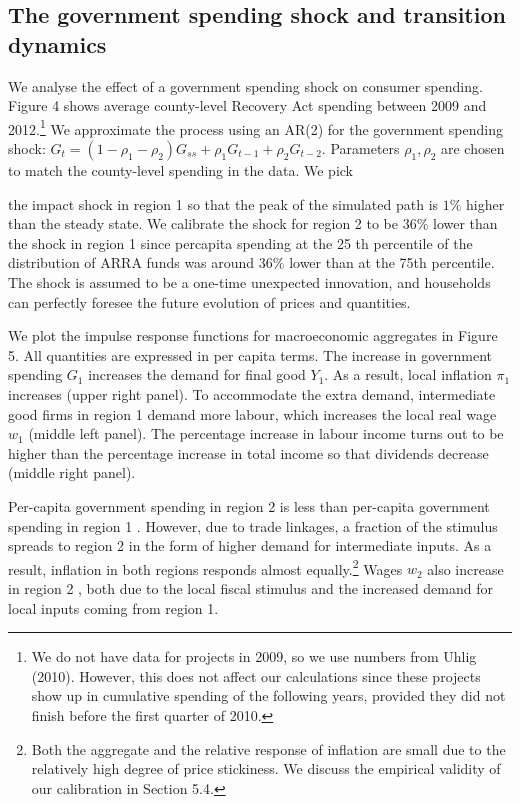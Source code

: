 \documentclass[\latexroot/\projectname]{subfiles}
\begin{document}
\subsection{The government spending shock and transition dynamics}
We analyse the effect of a government spending shock on consumer spending. Figure 4 shows average county-level Recovery Act spending between 2009 and 2012.\footnote{We do not have data for projects in 2009, so we use numbers from Uhlig (2010). However, this does not affect our calculations since these projects show up in cumulative spending of the following years, provided they did not finish before the first quarter of 2010.} We approximate the process using an AR(2) for the government spending shock: $G_{t}=\left(1-\rho_{1}-\rho_{2}\right) G_{s s}+\rho_{1} G_{t-1}+ \rho_{2} G_{t-2}$. Parameters $\rho_{1}, \rho_{2}$ are chosen to match the county-level spending in the data. We pick



the impact shock in region 1 so that the peak of the simulated path is $1 \%$ higher than the steady state. We calibrate the shock for region 2 to be $36 \%$ lower than the shock in region 1 since percapita spending at the 25 th percentile of the distribution of ARRA funds was around $36 \%$ lower than at the 75th percentile. The shock is assumed to be a one-time unexpected innovation, and households can perfectly foresee the future evolution of prices and quantities.

We plot the impulse response functions for macroeconomic aggregates in Figure 5. All quantities are expressed in per capita terms. The increase in government spending $G_{1}$ increases the demand for final good $Y_{1}$. As a result, local inflation $\pi_{1}$ increases (upper right panel). To accommodate the extra demand, intermediate good firms in region 1 demand more labour, which increases the local real wage $w_{1}$ (middle left panel). The percentage increase in labour income turns out to be higher than the percentage increase in total income so that dividends decrease (middle right panel).

Per-capita government spending in region 2 is less than per-capita government spending in region 1 . However, due to trade linkages, a fraction of the stimulus spreads to region 2 in the form of higher demand for intermediate inputs. As a result, inflation in both regions responds almost equally.\footnote{Both the aggregate and the relative response of inflation are small due to the relatively high degree of price stickiness. We discuss the empirical validity of our calibration in Section 5.4.} Wages $w_{2}$ also increase in region 2 , both due to the local fiscal stimulus and the increased demand for local inputs coming from region 1.
\end{document}
